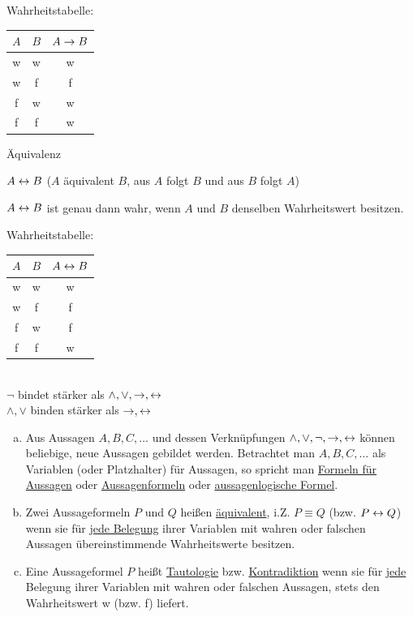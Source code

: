 \begin{enumerate}
\begin{minipage}{\linewidth}
		Wahrheitstabelle:
		\begin{tabular}{c|c|c}
			$A$ & $B$ & $A\rightarrow B$ \\
			\hline w & w & w \\
			w & f & f \\
			f & w & w \\
			f & f & w
		\end{tabular}
	\end{minipage}
	
	\begin{minipage}{\linewidth}
		{\bf\item Äquivalenz} $A\leftrightarrow B$ ({\flqq $A$ äquivalent $B$\frqq}, {\flqq aus $A$ folgt $B$ und aus $B$ folgt $A$\frqq})
		
		$A\leftrightarrow B$ ist genau dann wahr, wenn $A$ und $B$ denselben Wahrheitswert besitzen.
		
		Wahrheitstabelle:
		\begin{tabular}{c|c|c}
			$A$ & $B$ & $A\leftrightarrow B$ \\
			\hline w & w & w \\
			w & f & f \\
			f & w & f \\
			f & f & w
		\end{tabular}
	\end{minipage}
\end{enumerate}

\Bem\quad\\
$\neg$ bindet stärker als $\land, \lor, \rightarrow, \leftrightarrow$\\
$\land, \lor$ binden stärker als $\rightarrow, \leftrightarrow$

\Def
\begin{enumerate}[a)]
	\item Aus Aussagen $A,B,C,\ldots$ und dessen Verknüpfungen $\land, \lor, \neg, \rightarrow, \leftrightarrow$ können beliebige, neue Aussagen gebildet werden. Betrachtet man $A,B,C,\ldots$ als Variablen (oder Platzhalter) für Aussagen, so spricht man \ul{Formeln für Aussagen} oder \ul{Aussagenformeln} oder \ul{aussagenlogische Formel}.
	
	\item Zwei Aussageformeln $P$ und $Q$ heißen \ul{äquivalent}, i.Z. $P\equiv Q$ (bzw. $P\leftrightarrow Q$) wenn sie für \ul{jede Belegung} ihrer Variablen mit wahren oder falschen Aussagen übereinstimmende Wahrheitswerte besitzen.
	
	\item Eine Aussageformel $P$ heißt \ul{Tautologie} bzw. \ul{Kontradiktion} wenn sie für \ul{jede} Belegung ihrer Variablen mit wahren oder falschen Aussagen, stets den Wahrheitswert w (bzw. f) liefert.
\end{enumerate}

